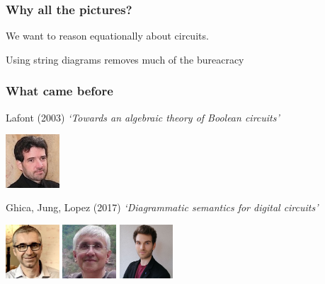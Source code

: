 \begin{frame}
    \frametitle{Why all the pictures?}
    \centering

    \LARGE
    We want to reason \alert{equationally} about circuits.

    \pause

    Using \alert{string diagrams} removes much of the bureacracy

\end{frame}
\begin{frame}
    \frametitle{What came before}

    \pause
    \alert{Lafont (2003)}
    \emph{`Towards an algebraic theory of Boolean circuits'}

    \includegraphics[width=0.15\textwidth]{imgs/lafont}

    \vspace{0.5em}
    \pause

    \alert{Ghica, Jung, Lopez (2017)}
    \emph{`Diagrammatic semantics for digital circuits'}

    \includegraphics[width=0.15\textwidth]{imgs/ghica}
    \includegraphics[width=0.15\textwidth]{imgs/achim}
    \includegraphics[width=0.15\textwidth]{imgs/lopez}
\end{frame}

